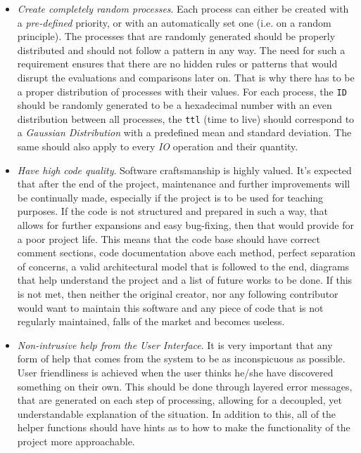 \documentclass{article}
\newcommand{\code}[1]{\colorbox{codebg}{{\color{black}\texttt{#1}}}}
\begin{document}
\begin{itemize}
\item \textit{Create completely random processes}. Each process can either be created with a \textit{pre-defined} priority, or with an automatically set one (i.e. on a random principle). The processes that are randomly generated should be properly distributed and should not follow a pattern in any way. The need for such a requirement ensures that there are no hidden rules or patterns that would disrupt the evaluations and comparisons later on. That is why there has to be a proper distribution of processes with their values. For each process, the \code{ID} should be randomly generated to be a hexadecimal number with an even distribution between all processes, the \code{ttl} (time to live) should correspond to a \textit{Gaussian Distribution} with a predefined mean and standard deviation. The same should also apply to every \textit{IO} operation and their quantity.

\item \textit{Have high code quality}. Software craftsmanship is highly valued. It's expected that after the end of the project, maintenance and further improvements will be continually made, especially if the project is to be used for teaching purposes. If the code is not structured and prepared in such a way, that allows for further expansions and easy bug-fixing, then that would provide for a poor project life. This means that the code base should have correct comment sections, code documentation above each method, perfect separation of concerns, a valid architectural model that is followed to the end, diagrams that help understand the project and a list of future works to be done. If this is not met, then neither the original creator, nor any following contributor would want to maintain this software and any piece of code that is not regularly maintained, falls of the market and becomes useless.

\item \textit{Non-intrusive help from the User Interface}. It is very important that any form of help that comes from the system to be as inconspicuous as possible. User friendliness is achieved when the user thinks he/she have discovered something on their own. This should be done through layered error messages, that are generated on each step of processing, allowing for a decoupled, yet understandable explanation of the situation. In addition to this, all of the helper functions should have hints as to how to make the functionality of the project more approachable.
\end{itemize}
\end{document}
